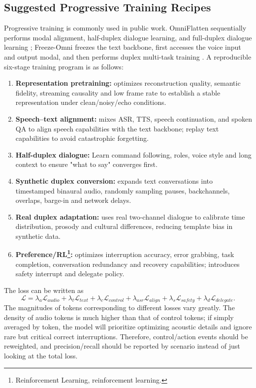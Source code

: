 \documentclass[UTF8,fontset=none,a4paper,10pt]{ctexart}
\begin{document}
\subsection{Suggested Progressive Training Recipes}

Progressive training is commonly used in public work. OmniFlatten sequentially performs modal alignment, half-duplex dialogue learning, and full-duplex dialogue learning \cite{en:zhang2024omniflatten}; Freeze-Omni freezes the text backbone, first accesses the voice input and output modal, and then performs duplex multi-task training \cite{en:wang2024freezeomni}. A reproducible six-stage training program is as follows:

\begin{enumerate}
\item \textbf{Representation pretraining: } optimizes reconstruction quality, semantic fidelity, streaming causality and low frame rate to establish a stable representation under clean/noisy/echo conditions.
\item \textbf{Speech--text alignment: } mixes ASR, TTS, speech continuation, and spoken QA to align speech capabilities with the text backbone; replay text capabilities to avoid catastrophic forgetting.
\item \textbf{Half-duplex dialogue: } Learn command following, roles, voice style and long context to ensure "what to say" converges first.
\item \textbf{Synthetic duplex conversion: } expands text conversations into timestamped binaural audio, randomly sampling pauses, backchannels, overlaps, barge-in and network delays.
\item \textbf{Real duplex adaptation: } uses real two-channel dialogue to calibrate time distribution, prosody and cultural differences, reducing template bias in synthetic data.
\item \textbf{Preference/RL\footnote{Reinforcement Learning, reinforcement learning. }: } optimizes interruption accuracy, error grabbing, task completion, conversation redundancy and recovery capabilities; introduces safety interrupt and delegate policy.
\end{enumerate}

The loss can be written as
\begin{equation}
\mathcal L=\lambda_a\mathcal L_{audio}+\lambda_t\mathcal L_{text}+\lambda_c\mathcal L_{control}
+\lambda_{asr}\mathcal L_{align}+\lambda_s\mathcal L_{safety}+\lambda_d\mathcal L_{delegate}.
\end{equation}
The magnitudes of tokens corresponding to different losses vary greatly. The density of audio tokens is much higher than that of control tokens; if simply averaged by token, the model will prioritize optimizing acoustic details and ignore rare but critical correct interruptions. Therefore, control/action events should be reweighted, and precision/recall should be reported by scenario instead of just looking at the total loss.
\end{document}
